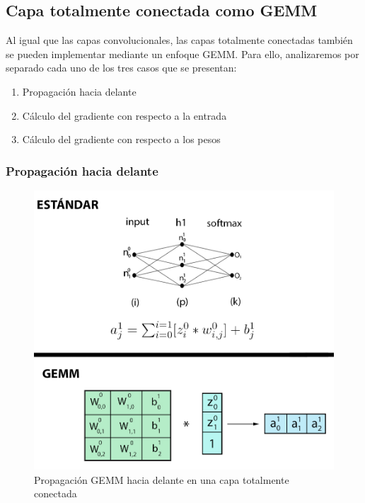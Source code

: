 \subsection{Capa totalmente conectada como GEMM \cite{nvidia_back_fully_GEMM}}

Al igual que las capas convolucionales, las capas totalmente conectadas también se pueden implementar mediante un enfoque GEMM. Para ello, analizaremos por separado cada uno de los tres casos que se presentan:
\begin{enumerate}[label=\textbullet, nosep]
	\item Propagación hacia delante
	\item Cálculo del gradiente con respecto a la entrada
	\item Cálculo del gradiente con respecto a los pesos
\end{enumerate}

\subsubsection{Propagación hacia delante}

\begin{figure}[H]
	\centering
	\includegraphics[scale=0.3]{imagenes/gemm_fully_forward.jpg}  
	\caption{Propagación GEMM hacia delante en una capa totalmente conectada}
	\label{fig:gemm_fully_forward}
\end{figure}


